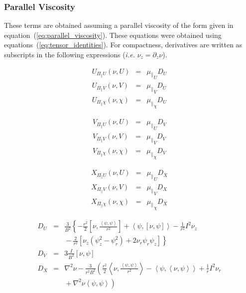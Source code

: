 \documentclass[letterpaper]{book}
\newcommand{\tensor}[1]{\mathsf{#1}}
\renewcommand{\P}{\tensor{\Pi}}
\newcommand{\lp}[1]{\nabla^2 #1}
\newcommand{\pb}[2]{\left[#1,#2\right]}
\newcommand{\ip}[2]{\left\langle  #1,#2\right\rangle}
\begin{document}
\subsubsection{Parallel Viscosity}

These terms are obtained assuming a parallel viscosity of the form
given in equation~(\ref{eq:parallel_viscosity}).  These equations were
obtained using equations~(\ref{eq:tensor_identities}).  For
compactness, derivatives are written as subscripts in the following
expressions (\textit{i.e.} $\nu_z = \partial_z \nu$).

\begin{equation}
  \begin{array}{lcl}
    U_{\P_\parallel U}(\nu, U) & = & {\mu_\parallel}_U D_U
    \\
    U_{\P_\parallel V}(\nu, V) & = & {\mu_\parallel}_V D_U
    \\
    U_{\P_\parallel \chi}(\nu, \chi) & = & {\mu_\parallel}_\chi D_U
  \end{array}
\end{equation}

\begin{equation}
  \begin{array}{lcl}
    V_{\P_\parallel U}(\nu, U) & = & {\mu_\parallel}_U D_V
    \\
    V_{\P_\parallel V}(\nu, V) & = & {\mu_\parallel}_V D_V
    \\
    V_{\P_\parallel \chi}(\nu, \chi) & = & {\mu_\parallel}_\chi D_V
  \end{array}
\end{equation}

\begin{equation}
  \begin{array}{lcl}
    X_{\P_\parallel U}(\nu, U) & = & {\mu_\parallel}_U D_X
    \\
    X_{\P_\parallel V}(\nu, V) & = & {\mu_\parallel}_V D_X
    \\
    X_{\P_\parallel \chi}(\nu, \chi) & = & {\mu_\parallel}_\chi D_X
  \end{array}
\end{equation}

\begin{eqnarray*}
  D_U & = & \frac{3}{B^2} \left\{ 
  - \frac{r^2}{2}\pb{\nu}{\frac{\ip{\psi}{\psi}}{r^2}}
  + \ip{\psi}{\pb{\nu}{\psi}} 
  - \frac{1}{r^2} I^2 \nu_z 
  \right.\\ && \left. \mbox{}
  - \frac{2}{r^2}\left[ \nu_z (\psi_z^2 - \psi_r^2) + 2\nu_r \psi_r \psi_z
    \right]
  \right\}
  \\
  D_V & = & 3 \frac{I}{B^2} \pb{\nu}{\psi}
  \\
  D_X & = & \lp{\nu} - \frac{3}{r^2 B^2} \left(
    \frac{r^2}{2} \ip{\nu}{\frac{\ip{\psi}{\psi}}{r^2}}
    - \ip{\psi}{\ip{\nu}{\psi}} 
    + \frac{1}{r} I^2 \nu_r 
    \right.\\ && \left. \mbox{}
    + \lp{\nu} \ip{\psi}{\psi}
    \right)
\end{eqnarray*}
\end{document}
